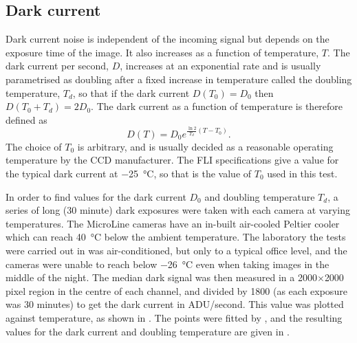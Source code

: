 \subsection{Dark current}
\label{sec:dc}
\begin{colsection}

Dark current noise is independent of the incoming signal but depends on the exposure time of the image. It also increases as a function of temperature, $T$. The dark current per second, $D$, increases at an exponential rate and is usually parametrised as doubling after a fixed increase in temperature called the doubling temperature, $T_d$, so that if the dark current $D(T_0) = D_0$ then $D(T_0 + T_d) = 2D_0$. The dark current as a function of temperature is therefore defined as
%
\begin{equation}
    D(T) = D_0 e^{\frac{\ln2}{T_d}(T - T_0)}.
    \label{eq:dc}
\end{equation}
%
The choice of $T_0$ is arbitrary, and is usually decided as a reasonable operating temperature by the CCD manufacturer. The FLI specifications give a value for the typical dark current at \SI{-25}{\celsius}, so that is the value of $T_0$ used in this test.

In order to find values for the dark current $D_0$ and doubling temperature $T_d$, a series of long (30 minute) dark exposures were taken with each camera at varying temperatures. The MicroLine cameras have an in-built air-cooled Peltier cooler which can reach \SI{40}{\celsius} below the ambient temperature. The laboratory the tests were carried out in was air-conditioned, but only to a typical office level, and the cameras were unable to reach below \SI{-26}{\celsius} even when taking images in the middle of the night. The median dark signal was then measured in a 2000$\times$2000 pixel region in the centre of each channel, and divided by 1800 (as each exposure was 30 minutes) to get the dark current in ADU/second. This value was plotted against temperature, as shown in . The points were fitted by , and the resulting values for the dark current and doubling temperature are given in .


\end{colsection}
